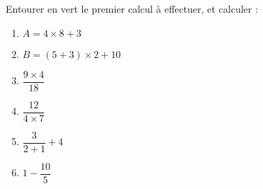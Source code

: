 
\begin{exercice}\label{exosmath-0848}

    Entourer en vert le premier calcul à effectuer, et calculer :
    \begin{multicols}{2}
        \begin{enumerate}
\item
    \( A=4\times 8+3\)
\item
    \( B=(5+3)\times 2+10\)
\item
    \( \dfrac{ 9\times 4 }{ 18 }\)
\item
    \( \dfrac{ 12 }{ 4\times 7 }\)
\item
    \( \dfrac{ 3 }{ 2+1 }+4\)
\item
    \( 1-\dfrac{ 10 }{ 5 }\)
        \end{enumerate}
    \end{multicols}


\end{exercice}
